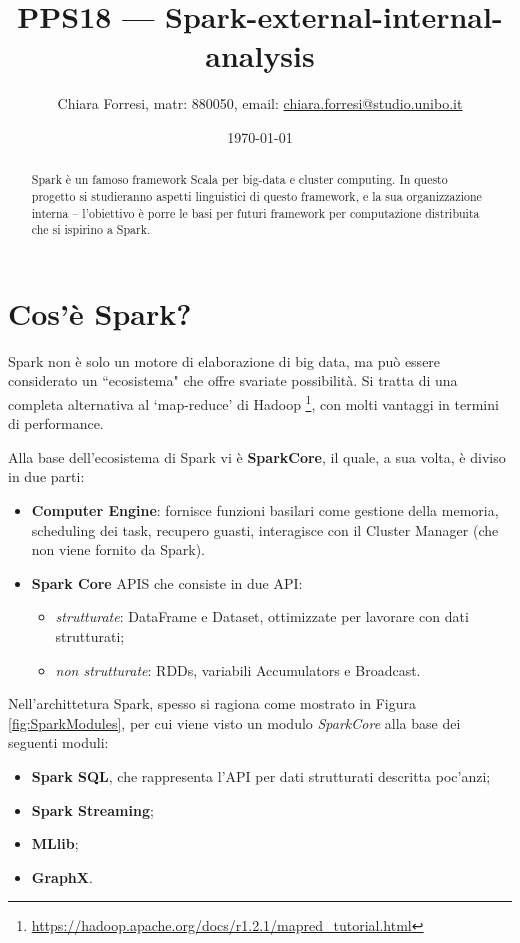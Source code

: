 \documentclass[12pt,italian]{article}
\title{PPS18  --- Spark-external-internal-analysis}
\author{Chiara Forresi, matr: 880050, email: {\url{chiara.forresi@studio.unibo.it}}}
\date{\today}
\begin{document}
\begin{titlingpage}
	\maketitle
	\begin{abstract}
		Spark è un famoso framework Scala per big-data e cluster computing. In questo progetto si studieranno aspetti linguistici di questo framework, e la sua organizzazione interna -- l'obiettivo è porre le basi per futuri framework per computazione distribuita che si ispirino a Spark.
	\end{abstract}
\end{titlingpage}
\nocite{*}
\tableofcontents
\newpage

\section{Cos'è Spark?}
Spark non è solo un motore di elaborazione di big data, ma può essere considerato un ``ecosistema" che offre svariate possibilità.
Si tratta di una completa alternativa al `map-reduce' di Hadoop \footnote{\url{https://hadoop.apache.org/docs/r1.2.1/mapred\_tutorial.html}}, con molti vantaggi in termini di performance. 
\par Alla base dell'ecosistema di Spark vi è \textbf{SparkCore}, il quale, a sua volta, è diviso in due parti:
\begin{itemize}
	\item \textbf{Computer Engine}: fornisce funzioni basilari come gestione della memoria, scheduling dei task, recupero guasti, interagisce con il Cluster Manager (che non viene fornito da Spark).
	\item \textbf{Spark Core} APIS che consiste in due API:
	\begin{itemize}
		\item \textit{strutturate}: DataFrame e Dataset, ottimizzate per lavorare con dati strutturati;
		\item \textit{non strutturate}: RDDs, variabili Accumulators e Broadcast.
	\end{itemize}
\end{itemize}
Nell'archittetura Spark, spesso si ragiona come mostrato in Figura \ref{fig:SparkModules}, per cui viene visto un modulo \textit{SparkCore} alla base dei seguenti moduli:
\begin{itemize}
	\item \textbf{Spark SQL}, che rappresenta l'API per dati strutturati descritta poc'anzi;
	\item  \textbf{Spark Streaming};
	\item \textbf{MLlib};
	\item \textbf{GraphX}.
\end{itemize}
\end{document}
